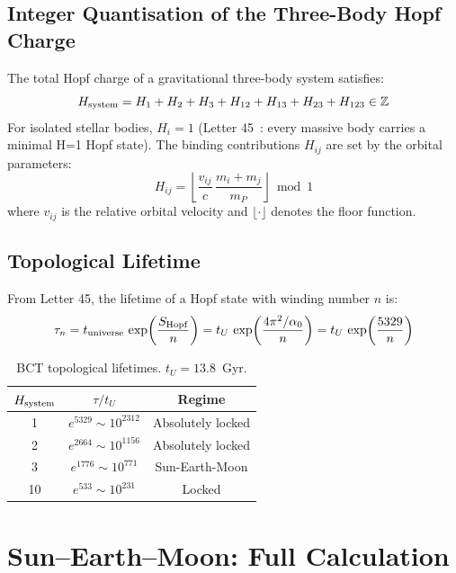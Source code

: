 \documentclass[twocolumn,10pt]{article}
\begin{document}
\subsection{Integer Quantisation of the Three-Body Hopf Charge}

The total Hopf charge of a gravitational three-body system satisfies:
%
\begin{equation}
H_{\rm system} = H_1 + H_2 + H_3 + H_{12} + H_{13} + H_{23} + H_{123} \in \mathbb{Z}
\end{equation}
%
For isolated stellar bodies, $H_i = 1$ (Letter 45~\cite{bct_l45}: every massive body
carries a minimal H=1 Hopf state). The binding contributions $H_{ij}$ are set by
the orbital parameters:
%
\begin{equation}
H_{ij} = \left\lfloor \frac{v_{ij}}{c}\,\frac{m_i + m_j}{m_P} \right\rfloor \bmod 1
\end{equation}
%
where $v_{ij}$ is the relative orbital velocity and $\lfloor\cdot\rfloor$ denotes the
floor function.

\subsection{Topological Lifetime}

From Letter 45, the lifetime of a Hopf state with winding number $n$ is:
%
\begin{equation}
\tau_n = t_{\rm universe}\,\exp\!\left(\frac{S_{\rm Hopf}}{n}\right)
= t_U\,\exp\!\left(\frac{4\pi^2/\alpha_0}{n}\right)
= t_U\,\exp\!\left(\frac{5329}{n}\right)
\end{equation}
%
\begin{table}[h]
\centering
\begin{tabular}{@{}ccc@{}}
\toprule
$H_{\rm system}$ & $\tau / t_U$ & Regime \\
\midrule
1 & $e^{5329} \sim 10^{2312}$ & Absolutely locked \\
2 & $e^{2664} \sim 10^{1156}$ & Absolutely locked \\
3 & $e^{1776} \sim 10^{771}$  & Sun-Earth-Moon \\
10 & $e^{533} \sim 10^{231}$  & Locked \\
\bottomrule
\end{tabular}
\caption{BCT topological lifetimes. $t_U = 13.8$~Gyr.}
\end{table}

\section{Sun--Earth--Moon: Full Calculation}
\end{document}
